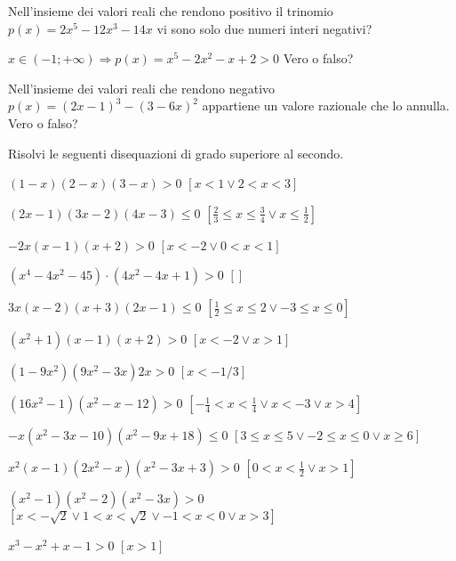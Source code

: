 \begin{esercizio}
\label{ese:4.35}
Nell'insieme dei valori reali che rendono positivo il trinomio 
\(p(x)=2x^5-12x^3-14x\) vi sono solo due numeri interi negativi?
\end{esercizio}

\begin{esercizio}
 \label{ese:4.36}
\(x\in (-1;+\infty )\Rightarrow p(x)=x^5-2x^2-x+2>0\) Vero o falso?
\end{esercizio}

\begin{esercizio}
\label{ese:4.37}
Nell'insieme dei valori reali che rendono negativo \(p(x)=(2x-1)^3-(3-6x)^2\) 
appartiene un valore razionale che lo annulla. Vero o falso?
\end{esercizio}

\begin{esercizio}[\Ast]
\label{ese:4.38}
Risolvi le seguenti disequazioni di grado superiore al secondo.
\begin{enumeratea}
\item \((1-x)(2-x)(3-x)>0\) \hfill \(\left[x<1\vee 2<x<3\right]\)
\item \((2x-1)(3x-2)(4x-3)\le 0\) 
 \hfill \(\left[\frac 2 3\le x\le \frac 3 4 \vee x\le \frac 1 2\right]\)
\item \(-2x(x-1)(x+2)>0\) \hfill \(\left[x<-2\vee 0<x<1\right]\)
\item \( \left(x^4-4x^2-45\right)\cdot \left(4x^2-4x+1\right)>0 \) 
 \hfill \(\left[\right]\)
\item \(3x(x-2)(x+3)(2x-1)\le 0\) 
 \hfill \(\left[\frac 1 2\le x\le 2\vee -3\le x\le 0\right]\)
\item \(\left(x^2+1\right)(x-1)(x+2)>0\) \hfill \(\left[x<-2\vee x>1\right]\)
\item \(\left(1-9x^2\right)\left(9x^2-3x\right)2x>0\) 
 \hfill \(\left[x<-1/3\right]\)
\item \(\left(16x^2-1\right)\left(x^2-x-12\right)>0\) 
 \hfill \(\left[-\frac 1 4<x<\frac 1 4\vee x<-3\vee x>4\right]\)
\item \(-x\left(x^2-3x-10\right)\left(x^2-9x+18\right)\le 0\)
 \hfill \(\left[3\le x\le 5\vee -2\le x\le 0\vee x\ge 6\right]\)
\item \(x^2(x-1)\left(2x^2-x\right)\left(x^2-3x+3\right)>0\)
 \hfill \(\left[0<x<\frac 1 2\vee x>1\right]\)
\item \(\left(x^2-1\right)\left(x^2-2\right)\left(x^2-3x\right)>0\)
 \hfill \(\left[x<-\sqrt 2\vee 1<x<\sqrt 2\vee -1<x<0\vee x>3\right]\)
\item \(x^3-x^2+x-1>0\) \hfill \(\left[x>1\right]\)

\end{enumeratea}
\end{esercizio}
